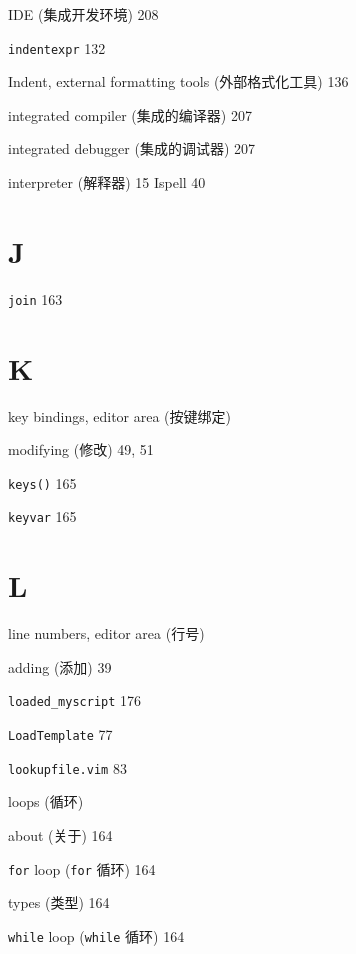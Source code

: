 \begin{multicols}{2}
\hangindent=3pc  IDE (集成开发环境) 208

\hangindent=3pc  \texttt{indentexpr} 132

\hangindent=3pc  Indent, external formatting tools (外部格式化工具) 136

\hangindent=3pc  integrated compiler (集成的编译器) 207

\hangindent=3pc  integrated debugger (集成的调试器) 207

\hangindent=3pc  interpreter (解释器) 15
\hangindent=3pc  Ispell 40

\hangindent=3pc  \section*{J}

\hangindent=3pc  \texttt{join} 163

\hangindent=3pc  \section*{K}

\hangindent=3pc  key bindings, editor area (按键绑定) \par
\hangindent=3pc \quad modifying (修改) 49, 51 \par

\hangindent=3pc  \texttt{keys()} 165

\hangindent=3pc  \texttt{keyvar} 165

\hangindent=3pc  \section*{L}

\hangindent=3pc  line numbers, editor area (行号) \par
\hangindent=3pc \quad adding (添加) 39 \par

\hangindent=3pc  \texttt{loaded\_myscript} 176

\hangindent=3pc  \texttt{LoadTemplate} 77

\hangindent=3pc  \texttt{lookupfile.vim} 83

\hangindent=3pc  loops (循环) \par
\hangindent=3pc \quad about (关于) 164 \par
\hangindent=3pc \quad \texttt{for} loop (\texttt{for} 循环) 164 \par
\hangindent=3pc \quad types (类型) 164 \par
\hangindent=3pc \quad \texttt{while} loop (\texttt{while} 循环) 164 \par


\end{multicols}
